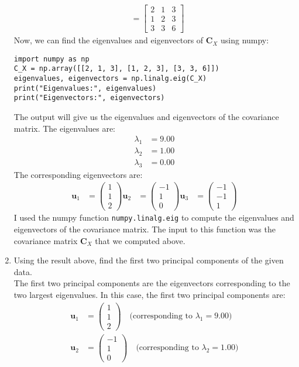 \documentclass[a3paper,12pt]{extarticle} %
\begin{document}
\begin{enumerate}
\begin{align}
&= \begin{bmatrix} 2 & 1 & 3 \\ 1 & 2 & 3 \\ 3 & 3 & 6 \end{bmatrix}
\end{align}
Now, we can find the eigenvalues and eigenvectors of $\mathbf{C}_X$ using numpy:
\begin{verbatim}
import numpy as np
C_X = np.array([[2, 1, 3], [1, 2, 3], [3, 3, 6]])
eigenvalues, eigenvectors = np.linalg.eig(C_X)
print("Eigenvalues:", eigenvalues)
print("Eigenvectors:", eigenvectors)
\end{verbatim}
The output will give us the eigenvalues and eigenvectors of the covariance matrix. The eigenvalues are:
\begin{align}
\lambda_1 &= 9.00\\
\lambda_2 &= 1.00\\
\lambda_3 &= 0.00
\end{align}
The corresponding eigenvectors are:
\begin{align}
    \mathbf{u}_1  &= \begin{pmatrix}
    1\\
    1\\
    2
    \end{pmatrix}
    \mathbf{u}_2  &= \begin{pmatrix}
    -1\\
    1\\
    0
    \end{pmatrix}
    \mathbf{u}_3  &= \begin{pmatrix}
    -1\\
    -1\\
    1
    \end{pmatrix}
\end{align}
I used the numpy function \texttt{numpy.linalg.eig} to compute the eigenvalues and eigenvectors of the covariance matrix. The input to this function was the covariance matrix $\mathbf{C}_X$ that we computed above.   
\item 
Using the result above, find the first two principal components of the given data.
\\ The first two principal components are the eigenvectors corresponding to the two largest eigenvalues. In this case, the first two principal components are:
\begin{align}
\mathbf{u}_1 &= \begin{pmatrix}
1\\
1\\
2
\end{pmatrix} \quad \text{(corresponding to } \lambda_1 = 9.00\text{)}\\
\mathbf{u}_2 &= \begin{pmatrix}
-1\\
1\\
0
\end{pmatrix} \quad \text{(corresponding to } \lambda_2 = 1.00\text{)}
\end{align}


\end{enumerate}
\end{document}
